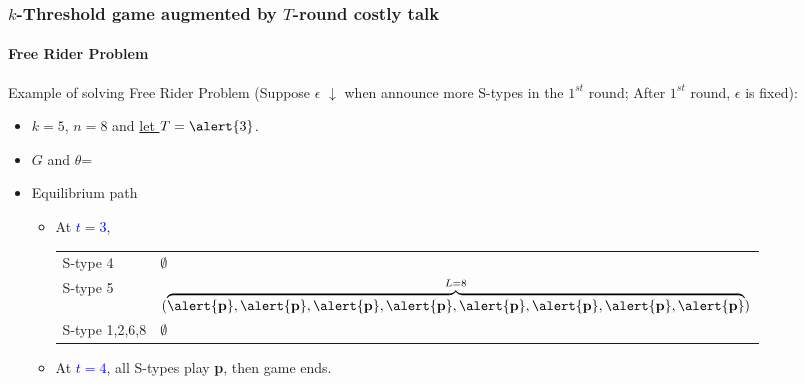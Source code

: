 \documentclass[8pt]{beamer}
\begin{document}
\begin{frame}
  \frametitle{$k$-Threshold game augmented by $T$-round costly talk}
  \framesubtitle{Free Rider Problem}
Example of solving Free Rider Problem (Suppose $\epsilon$ \alert{$\downarrow$} when announce \alert{more} S-types in the \alert{$1^{st}$} round; After $1^{st}$ round, $\epsilon$ is fixed):
\begin{itemize}
\item $k=5$, $n=8$ and \underline{let $T=\alert{3}$}.
\item $G$ and $\theta$=
\begin{center}
\end{center}
\end{itemize}

\begin{itemize}
\item Equilibrium path
\begin{itemize}
\item 

At \textcolor{blue}{$t=3$}, 
\begin{table}[h]
\begin{tabular}{ll }
S-type 4 & $\emptyset$\\
S-type 5 & $(\overbrace{\alert{\textbf{p}},\alert{\textbf{p}},\alert{\textbf{p}},\alert{\textbf{p}},\alert{\textbf{p}},\alert{\textbf{p}},\alert{\textbf{p}},\alert{\textbf{p}}}^{L=8})$\\
S-type 1,2,6,8 & $\emptyset$
\end{tabular}
\end{table}

\pause
\item At \textcolor{blue}{$t=4$}, all S-types play \textbf{p}, then game ends.

\end{itemize}

\end{itemize}



\end{frame}
\end{document}
